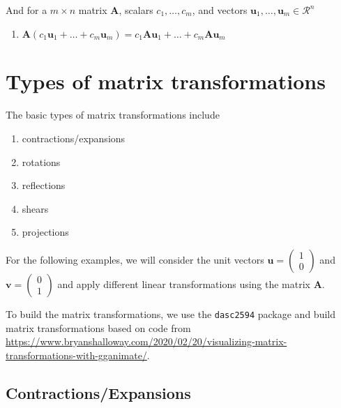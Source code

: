 \documentclass[
]{book}
\providecommand{\tightlist}{%
  \setlength{\itemsep}{0pt}\setlength{\parskip}{0pt}}
\theoremstyle{definition}
\theoremstyle{definition}
\theoremstyle{definition}
\theoremstyle{remark}
\begin{document}
And for a \(m \times n\) matrix \(\mathbf{A}\), scalars \(c_1, \ldots, c_m\), and vectors \(\mathbf{u}_1, \ldots, \mathbf{u}_m \in \mathcal{R}^n\)

\begin{enumerate}
\def\labelenumi{\arabic{enumi})}
\setcounter{enumi}{4}
\tightlist
\item
  \(\mathbf{A}(c_1 \mathbf{u}_1 + \ldots + c_m \mathbf{u}_m) = c_1 \mathbf{A}\mathbf{u}_1 + \ldots + c_m \mathbf{A} \mathbf{u}_m\)
\end{enumerate}

\hypertarget{types-of-matrix-transformations}{%
\section{Types of matrix transformations}\label{types-of-matrix-transformations}}

The basic types of matrix transformations include

\begin{enumerate}
\def\labelenumi{\arabic{enumi})}
\tightlist
\item
  contractions/expansions
\item
  rotations
\item
  reflections
\item
  shears
\item
  projections
\end{enumerate}

For the following examples, we will consider the unit vectors \(\mathbf{u} = \begin{pmatrix} 1 \\ 0 \end{pmatrix}\) and \(\mathbf{v} = \begin{pmatrix} 0 \\ 1 \end{pmatrix}\) and apply different linear transformations using the matrix \(\mathbf{A}\).

To build the matrix transformations, we use the \texttt{dasc2594} package and build matrix transformations based on code from \url{https://www.bryanshalloway.com/2020/02/20/visualizing-matrix-transformations-with-gganimate/}.

\hypertarget{contractionsexpansions}{%
\subsection{Contractions/Expansions}\label{contractionsexpansions}}
\end{document}
